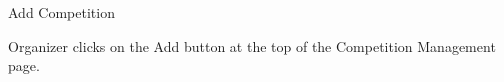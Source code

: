 
\begin{uc}{Add Competition}


    \begin{uc-trig}
        Organizer clicks on the Add button at the top of the Competition Management page.
    \end{uc-trig}

\end{uc}


